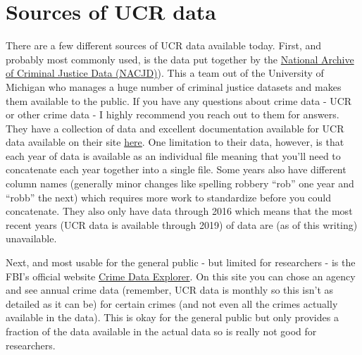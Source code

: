 \documentclass[
  12pt,
  openany]{book}
\begin{document}
\hypertarget{sources-of-ucr-data}{%
\section{Sources of UCR data}\label{sources-of-ucr-data}}

There are a few different sources of UCR data available today. First, and probably most commonly used, is the data put together by the \href{https://www.icpsr.umich.edu/web/pages/NACJD/index.html}{National Archive of Criminal Justice Data (NACJD)}). This a team out of the University of Michigan who manages a huge number of criminal justice datasets and makes them available to the public. If you have any questions about crime data - UCR or other crime data - I highly recommend you reach out to them for answers. They have a collection of data and excellent documentation available for UCR data available on their site \href{https://www.icpsr.umich.edu/web/NACJD/series/57}{here}. One limitation to their data, however, is that each year of data is available as an individual file meaning that you'll need to concatenate each year together into a single file. Some years also have different column names (generally minor changes like spelling robbery ``rob'' one year and ``robb'' the next) which requires more work to standardize before you could concatenate. They also only have data through 2016 which means that the most recent years (UCR data is available through 2019) of data are (as of this writing) unavailable.

Next, and most usable for the general public - but limited for researchers - is the FBI's official website \href{https://crime-data-explorer.fr.cloud.gov/}{Crime Data Explorer}. On this site you can chose an agency and see annual crime data (remember, UCR data is monthly so this isn't as detailed as it can be) for certain crimes (and not even all the crimes actually available in the data). This is okay for the general public but only provides a fraction of the data available in the actual data so is really not good for researchers.
\end{document}
